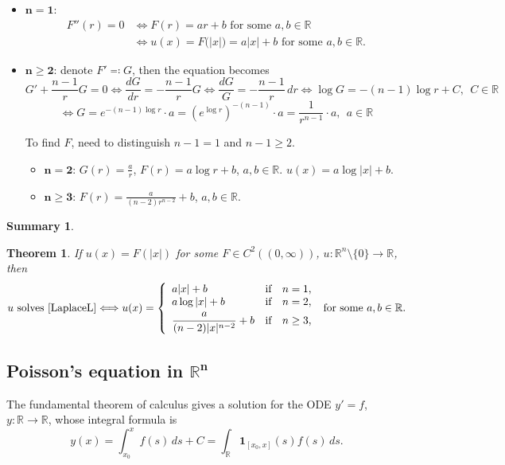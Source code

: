 \documentclass[12pt]{article}
\newtheorem{theorem}{Theorem}[section]
\theoremstyle{definition}
\newtheorem*{summary}{Summary}
\begin{document}
\begin{itemize}
\item $\boldsymbol{n=1}$:
\begin{align*}
F''(r)=0&\Longleftrightarrow F(r)=ar+b\text{ for some }a,b\in\mathbb{R}\\
&\Longleftrightarrow u(x)=F\big(|x|\big)=a|x|+b\text{ for some }a,b\in\mathbb{R}.
\end{align*}

\item $\boldsymbol{n\geq2}$: denote $F'\eqqcolon G$, then the equation becomes
\[G'+\frac{n-1}{r}G=0\Leftrightarrow\frac{dG}{dr}=-\frac{n-1}{r}G\Leftrightarrow\frac{dG}{G}=-\frac{n-1}{r}\,dr\Leftrightarrow\log G=-(n-1)\log r+C,\ \ C\in\mathbb{R}\]\[\Leftrightarrow G=e^{-(n-1)\log r}\cdot a=\left(e^{\log r}\right)^{-(n-1)}\cdot a=\frac{1}{r^{n-1}}\cdot a,\ \ a\in\mathbb{R}\]

To find $F$, need to distinguish $n-1=1$ and $n-1\geq2$.

\begin{itemize}
\item $\boldsymbol{n=2}$: $G(r)=\frac{a}{r}$, $F(r)=a\log r+b$, $a,b\in\mathbb{R}$. $u(x)=a\log|x|+b$.

\item $\boldsymbol{n\geq3}$: $F(r)=\frac{a}{(n-2)r^{n-2}}+b$, $a,b\in\mathbb{R}$.
\end{itemize}
\end{itemize}

\begin{summary}
\begin{theorem}
If $u(x)=F(|x|)$ for some $F\in C^2((0,\infty))$, $u:\mathbb{R}^n\setminus\{0\}\rightarrow\mathbb{R}$, then
\[u\text{ solves \eqref{LaplaceL}}\Longleftrightarrow u(x)=\left\{\begin{array}{lll}a|x|+b&\text{if}&n=1,\\a\log|x|+b&\text{if}&n=2,\vspace{1mm}\\\displaystyle{\frac{a}{(n-2)|x|^{n-2}}+b}&\text{if}&n\geq3,\end{array}\right.\text{ for some }a,b\in\mathbb{R}.\]
\end{theorem}
\end{summary}

\subsection[Poisson's equation in \texorpdfstring{$\mathbb{R}^n$}{R\textasciicircum n}]{Poisson's equation in \texorpdfstring{$\boldsymbol{\mathbb{R}^n}$}{R\textasciicircum n}}
The fundamental theorem of calculus gives a solution for the ODE $y'=f$, $y:\mathbb{R}\rightarrow\mathbb{R}$, whose integral formula is
\[y(x)=\int_{x_0}^xf(s)\,ds+C=\int_{\mathbb{R}}\boldsymbol{1}_{[x_0,x]}(s)f(s)\,ds.\]
\end{document}
